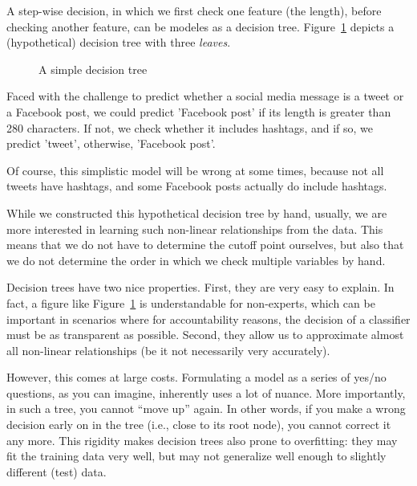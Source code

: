 A step-wise decision, in which we first check one feature (the
length), before checking another feature, can be modeles as a decision
tree.  Figure~\ref{fig:decisiontree} depicts a (hypothetical) decision
tree with three \textit{leaves}.

\begin{figure}
  \centering
{}
  \caption{\label{fig:decisiontree}A simple decision tree}
\end{figure}

Faced with the challenge to predict whether a social media message is
a tweet or a Facebook post, we could predict 'Facebook post' if its
length is greater than 280 characters. If not, we check whether it
includes hashtags, and if so, we predict 'tweet', otherwise, 'Facebook
post'.

Of course, this simplistic model will be wrong at some times, because
not all tweets have hashtags, and some Facebook posts actually do
include hashtags.

While we constructed this hypothetical decision tree by hand, usually,
we are more interested in learning such non-linear relationships from
the data.  This means that we do not have to determine the cutoff
point ourselves, but also that we do not determine the order in which
we check multiple variables by hand.

Decision trees have two nice properties. First, they are very easy to
explain.  In fact, a figure like Figure~\ref{fig:decisiontree} is
understandable for non-experts, which can be important in scenarios
where for accountability reasons, the decision of a classifier must be
as transparent as possible.  Second, they allow us to approximate
almost all non-linear relationships (be it not necessarily very
accurately).

However, this comes at large costs.  Formulating a model as a series
of yes/no questions, as you can imagine, inherently uses a lot of
nuance. More importantly, in such a tree, you cannot ``move up''
again. In other words, if you make a wrong decision early on in the
tree (i.e., close to its root node), you cannot correct it any more.
This rigidity makes decision trees also prone to overfitting: they may
fit the training data very well, but may not generalize well enough to
slightly different (test) data.

